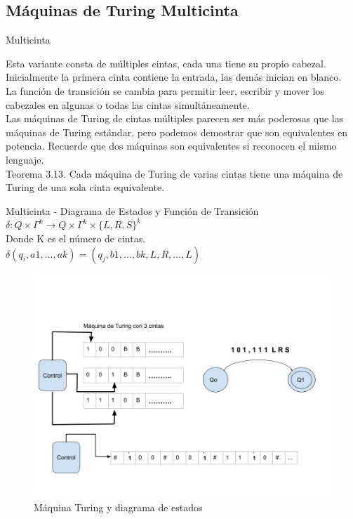 \documentclass[11pt]{beamer}
\begin{document}
	\subsection{Máquinas de Turing Multicinta}
	    \begin{frame}{Multicinta}
			\justifying
			
			Esta variante consta de múltiples cintas, cada una tiene su propio cabezal. Inicialmente la 	primera cinta contiene la entrada, las demás inician en blanco. \\
			La función de transición se cambia para permitir leer, escribir y mover los cabezales en algunas o todas las cintas 	simultáneamente. \\
			Las máquinas de Turing de cintas múltiples parecen ser más poderosas que las máquinas de Turing estándar, pero podemos demostrar que son equivalentes en potencia. Recuerde que dos máquinas son equivalentes si reconocen el mismo lenguaje.\\

            Teorema 3.13. Cada máquina de Turing de varias cintas tiene una máquina de Turing de una sola cinta equivalente.
			
		\end{frame}
		\begin{frame}{Multicinta - Diagrama de Estados y Función de Transición }
			\justifying
			$\delta : Q \times \Gamma^k \rightarrow Q \times \Gamma^k \times \{ L, R, S \}^k$ \\
			
			Donde K es el número de cintas.\\
			$\delta(q_{i}, a1, . . . , ak) = (q_{j} , b1, . . . , bk,L, R, . . . ,L)$ \\
			
			
			\begin{figure}[H]
				\centering
				\includegraphics[scale=0.27]{img/multitape.png}
				\caption{Máquina Turing y diagrama de estados}
				\label{fig: MultiTape}
			\end{figure}
		\end{frame}
		
\end{document}
